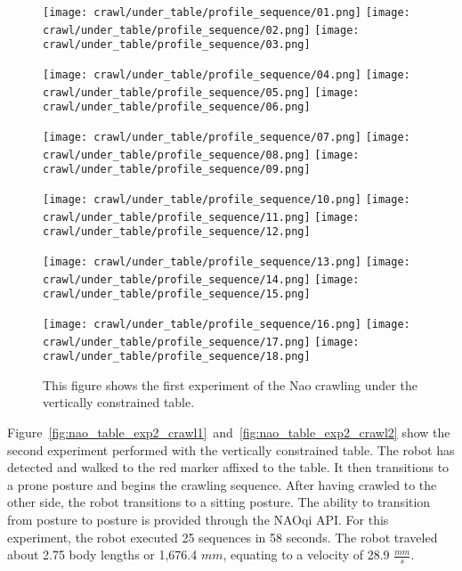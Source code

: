 \begin{figure}
\centering
\texttt{[image: crawl/under\_table/profile\_sequence/01.png]}
\texttt{[image: crawl/under\_table/profile\_sequence/02.png]}
\texttt{[image: crawl/under\_table/profile\_sequence/03.png]}

\vspace*{0.05in}
\centering
\texttt{[image: crawl/under\_table/profile\_sequence/04.png]}
\texttt{[image: crawl/under\_table/profile\_sequence/05.png]}
\texttt{[image: crawl/under\_table/profile\_sequence/06.png]}

\vspace*{0.05in}
\centering
\texttt{[image: crawl/under\_table/profile\_sequence/07.png]}
\texttt{[image: crawl/under\_table/profile\_sequence/08.png]}
\texttt{[image: crawl/under\_table/profile\_sequence/09.png]}

\vspace*{0.05in}
\centering
\texttt{[image: crawl/under\_table/profile\_sequence/10.png]}
\texttt{[image: crawl/under\_table/profile\_sequence/11.png]}
\texttt{[image: crawl/under\_table/profile\_sequence/12.png]}

\vspace*{0.05in}
\centering
\texttt{[image: crawl/under\_table/profile\_sequence/13.png]}
\texttt{[image: crawl/under\_table/profile\_sequence/14.png]}
\texttt{[image: crawl/under\_table/profile\_sequence/15.png]}

\vspace*{0.05in}
\centering
\texttt{[image: crawl/under\_table/profile\_sequence/16.png]}
\texttt{[image: crawl/under\_table/profile\_sequence/17.png]}
\texttt{[image: crawl/under\_table/profile\_sequence/18.png]}

\caption{This figure shows the first experiment of the Nao crawling under the vertically constrained table.}
\label{fig:nao_table_exp1_crawl1}
\end{figure}

Figure~\ref{fig:nao_table_exp2_crawl1}~and~\ref{fig:nao_table_exp2_crawl2} show the second
experiment performed with the vertically constrained table. The robot has detected and walked to
the red marker affixed to the table. It then transitions to a prone posture and begins the crawling
sequence. After having crawled to the other side, the robot transitions to a sitting posture.
The ability to transition from posture to posture is provided through the NAOqi API\@.
For this experiment, the robot executed 25 sequences in 58 seconds. The robot traveled
about 2.75 body lengths or 1,676.4 $mm$, equating to a velocity of 28.9 $\frac{mm}{s}$.


